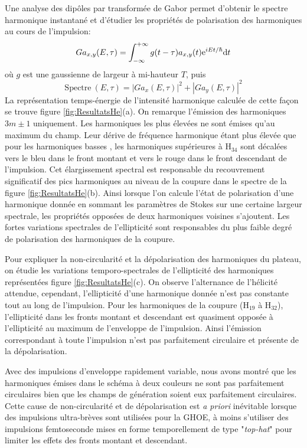 Une analyse des dipôles par transformée de Gabor permet d'obtenir le spectre harmonique instantané et d'étudier les propriétés de polarisation des harmoniques au cours de l'impulsion:
\begin{equation}
Ga_{x,y} (E,\tau) = \int_{- \infty}^{+\infty} g(t-\tau) a_{x,y}(t) \mathrm{e}^{iEt/\hbar} \mathrm{d} t
\end{equation}
où $g$ est une gaussienne de largeur à mi-hauteur $T$, puis
\begin{equation}
\text{Spectre} \: (E, \tau) = |Ga_x (E,\tau)|^2 + |Ga_y (E,\tau)|^2
\end{equation}
La représentation temps-énergie de l'intensité harmonique calculée de cette façon se trouve figure \ref{fig:ResultatsHe}(a). On remarque l'émission des harmoniques $3m \pm 1$ uniquement. Les harmoniques les plus élevées ne sont émises qu'au maximum du champ.  Leur dérive de fréquence harmonique étant plus élevée que pour les harmoniques basses , les harmoniques supérieures à H$_{34}$ sont décalées vers le bleu dans le front montant et vers le rouge dans le front descendant de l'impulsion. Cet élargissement spectral est responsable du recouvrement significatif des pics harmoniques au niveau de la coupure dans le spectre de la figure \ref{fig:ResultatsHe}(b). Ainsi lorsque l'on calcule l'état de polarisation d'une harmonique donnée en sommant les paramètres de Stokes sur une certaine largeur spectrale, les propriétés opposées de deux harmoniques voisines s'ajoutent. Les fortes variations spectrales de l'ellipticité sont responsables du plus faible degré de polarisation des harmoniques de la coupure.

Pour expliquer la non-circularité et la dépolarisation des harmoniques du plateau, on étudie les variations temporo-spectrales de l'ellipticité des harmoniques représentées figure \ref{fig:ResultatsHe}(c). On observe l'alternance de l'hélicité attendue, cependant, l'ellipticité d'une harmonique donnée n'est pas constante tout au long de l'impulsion. Pour les harmoniques de la coupure (H$_{19}$ à H$_{32}$), l'ellipticité dans les fronts montant et descendant est quasiment opposée à l'ellipticité au maximum de l'enveloppe de l'impulsion. Ainsi l'émission correspondant à toute l'impulsion n'est pas parfaitement circulaire et présente de la dépolarisation.

Avec des impulsions d'enveloppe rapidement variable, nous avons montré que les harmoniques émises dans le schéma à deux couleurs ne sont pas parfaitement circulaires bien que les champs de génération soient eux parfaitement circulaires. Cette cause de non-circularité et de dépolarisation est \textit{a priori} inévitable lorsque des impulsions ultra-brèves sont utilisées pour la GHOE, à moins s'utiliser des impulsions femtoseconde mises en forme temporellement de type "\textit{top-hat}" pour limiter les effets des fronts montant et descendant.

